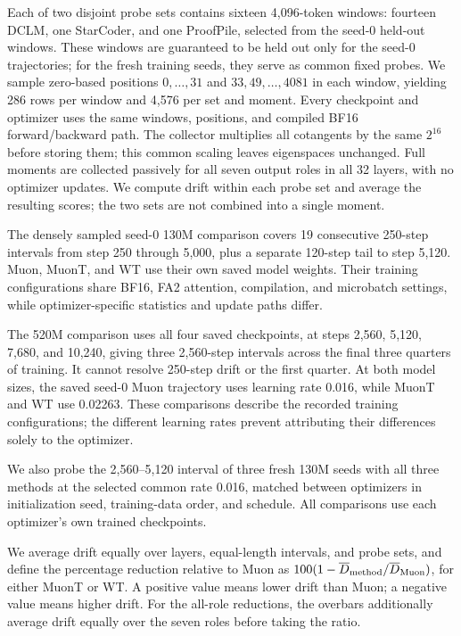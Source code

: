 Each of two disjoint probe sets contains sixteen 4,096-token windows: fourteen DCLM, one StarCoder, and one ProofPile, selected from the seed-0 held-out windows. These windows are guaranteed to be held out only for the seed-0 trajectories; for the fresh training seeds, they serve as common fixed probes. We sample zero-based positions $0,\ldots,31$ and $33,49,\ldots,4081$ in each window, yielding 286 rows per window and 4,576 per set and moment. Every checkpoint and optimizer uses the same windows, positions, and compiled BF16 forward/backward path. The collector multiplies all cotangents by the same $2^{16}$ before storing them; this common scaling leaves eigenspaces unchanged. Full moments are collected passively for all seven output roles in all 32 layers, with no optimizer updates. We compute drift within each probe set and average the resulting scores; the two sets are not combined into a single moment.

The densely sampled seed-0 130M comparison covers 19 consecutive 250-step intervals from step 250 through 5,000, plus a separate 120-step tail to step 5,120. Muon, MuonT, and WT use their own saved model weights. Their training configurations share BF16, FA2 attention, compilation, and microbatch settings, while optimizer-specific statistics and update paths differ.

The 520M comparison uses all four saved checkpoints, at steps 2,560, 5,120, 7,680, and 10,240, giving three 2,560-step intervals across the final three quarters of training. It cannot resolve 250-step drift or the first quarter. At both model sizes, the saved seed-0 Muon trajectory uses learning rate 0.016, while MuonT and WT use 0.02263. These comparisons describe the recorded training configurations; the different learning rates prevent attributing their differences solely to the optimizer.

We also probe the 2,560--5,120 interval of three fresh 130M seeds with all three methods at the selected common rate 0.016, matched between optimizers in initialization seed, training-data order, and schedule. All comparisons use each optimizer's own trained checkpoints.

We average drift equally over layers, equal-length intervals, and probe sets, and define the percentage reduction relative to Muon as $100(1-\overline D_{\rm method}/\overline D_{\rm Muon})$, for either MuonT or WT. A positive value means lower drift than Muon; a negative value means higher drift. For the all-role reductions, the overbars additionally average drift equally over the seven roles before taking the ratio.

